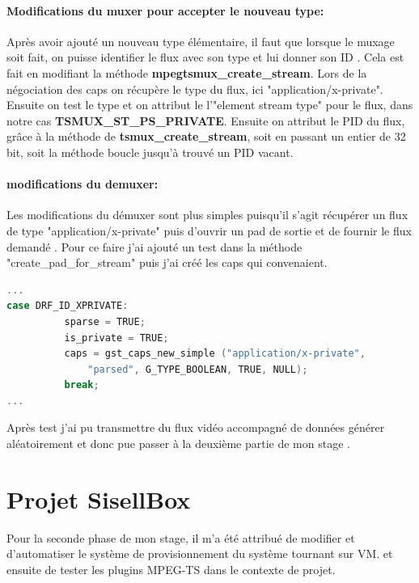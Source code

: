 \paragraph{Modifications du muxer pour accepter le nouveau type:} Après avoir ajouté un nouveau type élémentaire, il faut que lorsque le muxage soit fait, on puisse identifier le flux avec son type et lui donner son ID . Cela est fait en modifiant la méthode \textbf{mpegtsmux\_create\_stream}. Lors de la négociation des caps on récupère le type du flux, ici "application/x-private". Ensuite on test le type et on attribut le l'"element stream type" pour le flux, dans notre cas \textbf{TSMUX\_ST\_PS\_PRIVATE}. Ensuite on attribut le PID du flux, grâce à la méthode de \textbf{tsmux\_create\_stream}, soit en passant un entier de 32 bit, soit la méthode boucle jusqu'à trouvé un PID vacant.
\paragraph{modifications du demuxer:}  Les modifications du démuxer sont plus simples puisqu'il s'agit récupérer un flux de type "application/x-private" puis d'ouvrir un pad de sortie et de fournir le flux demandé . Pour ce faire j'ai ajouté un test dans la méthode "create\_pad\_for\_stream" puis j'ai créé les caps qui convenaient.
\begin{lstlisting}[language=C, caption=création de caps pour le flux sortant,label=demux_c]
...
case DRF_ID_XPRIVATE:
          sparse = TRUE;
          is_private = TRUE;
          caps = gst_caps_new_simple ("application/x-private",
              "parsed", G_TYPE_BOOLEAN, TRUE, NULL);
          break;
...
\end{lstlisting}

Après test j'ai pu transmettre du flux vidéo accompagné de données générer aléatoirement et donc pue passer à la deuxième partie de mon stage .

\section{Projet SisellBox}

Pour la seconde phase de mon stage, il m'a été attribué de modifier et d'automatiser le système de provisionnement du système tournant sur VM. et ensuite de tester les plugins MPEG-TS dans le contexte de projet.

